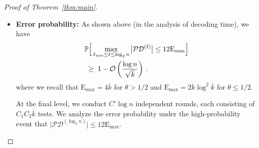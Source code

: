 \documentclass[journal]{IEEEtran}
\newcommand{\rEm}{\mathrm{E}_{\max}}
\theoremstyle{definition}
\theoremstyle{definition}
\newcommand{\Tc}{\mathcal{T}}
\newcommand{\PP}{\mathbb{P}}
\newcommand{\ER}{\mathrm{ER}}
\newcommand{\kb}{\overline{k}}
\newcommand{\bigO}{\mathcal{O}}
\begin{document}
\begin{proof}[Proof of Theorem~\ref{thm:main}]
\begin{itemize}
    
\item{ \textbf{Error probability:} As shown above (in the analysis of decoding time), we have
\begin{align}
    &\PP\Big[ \max_{\ell_{\min} \le \ell \le \log_2 n} 
       \big|\mathcal{PD}^{(\ell)}\big| \le 12\rEm \Big] \notag \\
    &\;\ge\; 1 - \bigO \left( \frac{\log n}{\sqrt{k}} \right) \, .
    \label{eq:bound_PD_all_levels}
\end{align}
where we recall that $\rEm = 4\kb$ for $\theta>1/2$ and $\rEm = 2\kb \log^2 \kb$ for $\theta\le 1/2$.

At the final level, we conduct $C'\log n$ independent rounds, each consisting of $C_1 C_2 \kb$ tests. We analyze the error probability under the high-probability event that $\big|\mathcal{PD}^{(\log_2 n)}\big|\le 12\rEm$.

}
\end{itemize}
\end{proof}
\end{document}
